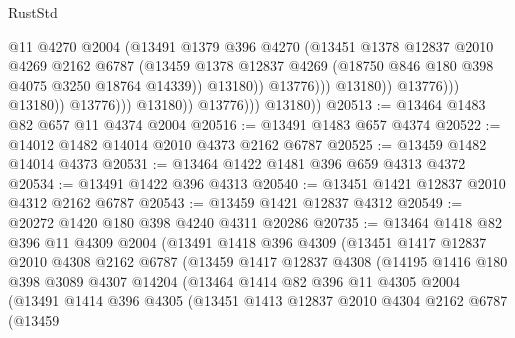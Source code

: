 \begin{lexlean}{RustStd}
\begin{coremodule}
                                            @11
                                            @4270
                                            @2004
                                            (@13491
                                              @1379
                                              @396
                                              @4270
                                              (@13451
                                                @1378
                                                @12837
                                                @2010
                                                @4269
                                                @2162
                                                @6787
                                                (@13459
                                                  @1378
                                                  @12837
                                                  @4269
                                                  (@18750 @846 @180 @398 @4075 @3250 @18764 @14339))
                                                @13180))
                                            @13776)))
                                      @13180))
                                  @13776)))
                            @13180))
                        @13776)))
                  @13180))
              @13776)))
        @13180))
@20513 := @13464 @1483 @82 @657 @11 @4374 @2004
@20516 := @13491 @1483 @657 @4374
@20522 := @14012 @1482 @14014 @2010 @4373 @2162 @6787
@20525 := @13459 @1482 @14014 @4373
@20531 := @13464 @1422 @1481 @396 @659 @4313 @4372
@20534 := @13491 @1422 @396 @4313
@20540 := @13451 @1421 @12837 @2010 @4312 @2162 @6787
@20543 := @13459 @1421 @12837 @4312
@20549 := @20272 @1420 @180 @398 @4240 @4311 @20286
@20735 := @13464
    @1418
    @82
    @396
    @11
    @4309
    @2004
    (@13491
      @1418
      @396
      @4309
      (@13451
        @1417
        @12837
        @2010
        @4308
        @2162
        @6787
        (@13459
          @1417
          @12837
          @4308
          (@14195
            @1416
            @180
            @398
            @3089
            @4307
            @14204
            (@13464
              @1414
              @82
              @396
              @11
              @4305
              @2004
              (@13491
                @1414
                @396
                @4305
                (@13451
                  @1413
                  @12837
                  @2010
                  @4304
                  @2162
                  @6787
                  (@13459

\end{coremodule}
\end{lexlean}
